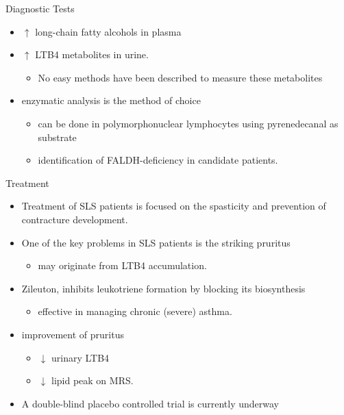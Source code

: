 \documentclass[presentation, smaller]{beamer}
\begin{document}
\begin{frame}[label={sec:org49848e5}]{Diagnostic Tests}
\begin{itemize}
\item \(\uparrow\) long-chain fatty alcohols in plasma
\item \(\uparrow\) LTB4 metabolites in urine.
\begin{itemize}
\item No easy methods have been described to measure these metabolites
\end{itemize}
\item enzymatic analysis is the method of choice
\begin{itemize}
\item can be done in polymorphonuclear lymphocytes using pyrenedecanal as substrate
\item identification of FALDH-deficiency in candidate patients.
\end{itemize}
\end{itemize}
\end{frame}

\begin{frame}[label={sec:orgc889018}]{Treatment}
\begin{itemize}
\item Treatment of SLS patients is focused on the spasticity and prevention of contracture development.
\item One of the key problems in SLS patients is the striking pruritus
\begin{itemize}
\item may originate from LTB4 accumulation.
\end{itemize}
\item Zileuton, inhibits leukotriene formation by blocking its biosynthesis
\begin{itemize}
\item effective in managing chronic (severe) asthma.
\end{itemize}
\item improvement of pruritus
\begin{itemize}
\item \(\downarrow\) urinary LTB4
\item \(\downarrow\) lipid peak on MRS.
\end{itemize}
\item A double-blind placebo controlled trial is currently underway
\end{itemize}
\end{frame}
\end{document}
